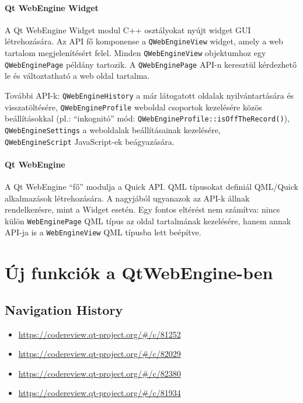 \documentclass[12pt]{report}
\let\origurl\url
\renewcommand{\url}[1]{%
    \textcolor{blue}{\origurl{#1}}
}
\newcommand{\gerrit}[1]{%
    \textcolor{qtgreen}{\origurl{https://codereview.qt-project.org/\#/c/#1}}
}
\begin{document}
\subsubsection{Qt WebEngine Widget}
A Qt WebEngine Widget modul C++ osztályokat nyújt widget GUI létrehozására. Az API
fő komponense a \texttt{QWebEngineView} widget, amely a web tartalom megjelenítésért felel.
Minden \texttt{QWebEngineView} objektumhoz egy \texttt{QWebEnginePage} példány tartozik.
A \texttt{QWebEnginePage} API-n keresztül kérdezhető le és változtatható a web oldal
tartalma.

További API-k: \texttt{QWebEngineHistory} a már látogatott oldalak nyilvántartására és
visszatöltésére, \texttt{QWebEngineProfile} weboldal csoportok kezelésére közös
beállításokkal (pl.: ``inkognitó'' mód: \texttt{QWebEngineProfile::isOffTheRecord()}),
\texttt{QWebEngineSettings} a weboldalak beállításainak kezelésére, \\
\texttt{QWebEngineScript} JavaScript-ek beágyazására.

\subsubsection{Qt WebEngine}
A Qt WebEngine ``fő'' modulja a Quick API. QML típusokat definiál QML/Quick alkalmazások
létrehozására. A nagyjából ugyanazok az API-k állnak rendelkezésre, mint a Widget esetén.
Egy fontos eltérést nem számítva: nincs külön \texttt{WebEnginePage} QML típus az oldal
tartalmának kezelésére, hanem annak API-ja is a \texttt{WebEngineView} QML típusba lett
beépítve.


\chapter{Új funkciók a QtWebEngine-ben}

\section{Navigation History}

\begin{center}
    \begin{reviewbox}
        \begin{itemize}
            \renewcommand{\labelitemi}{\textcolor{qtgreen}{$\blacktriangleright$}}
            \item \gerrit{81252}
            \item \gerrit{82029}
            \item \gerrit{82380}
            \item \gerrit{81934}
        \end{itemize}
    \end{reviewbox}
\end{center}
\end{document}
